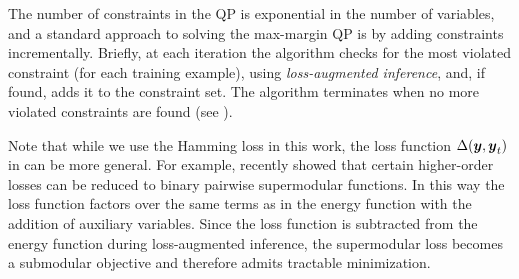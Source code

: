 \documentclass[twoside,doublespace,onecolumn,11pt,a4paper]{book}
\begin{document}
The number of constraints in the QP is exponential in the number of
variables, and a standard approach to solving the max-margin QP is by
adding constraints incrementally. Briefly, at each iteration the
algorithm checks for the most violated constraint (for each training
example), using \emph{loss-augmented inference}, and, if found, adds
it to the constraint set. The algorithm terminates when no more
violated constraints are found (see ).

Note that while we use the Hamming loss in this work, the loss
function $\Delta({\boldsymbol{y}}, {\boldsymbol{y}}_t)$ in  can be more
general. For example, \citet{Pletscher:AISTATS12} recently showed that
certain higher-order losses can be reduced to binary pairwise
supermodular functions. In this way the loss function factors over the
same terms as in the energy function with the addition of auxiliary
variables. Since the loss function is subtracted from the energy
function during loss-augmented inference, the supermodular loss
becomes a submodular objective and therefore admits tractable
minimization.






\end{document}
